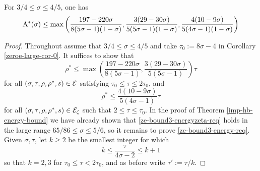 \begin{theorem}\label{imp-energy-bound3}
For $3/4 \le \sigma \le 4/5$, one has 
\[
\mathrm{A}^*(\sigma) \le \max\left(\frac{197 - 220\sigma}{8(5\sigma - 1)(1 - \sigma)}, \frac{3(29 - 30\sigma)}{5(5\sigma - 1)(1 - \sigma)}, \frac{4(10 - 9\sigma)}{5(4\sigma - 1)(1 - \sigma)}\right)
\]
\end{theorem}

\derived 
{}

\begin{proof}
Throughout assume that $3/4 \le \sigma \le 4/5$ and take $\tau_0 := 8\sigma - 4$ in Corollary \ref{zeroe-large-cor-0}. It suffices to show that 
\begin{equation}\label{ze-bound3-energy-req}
\rho^* \le \max\left(\frac{197 - 220\sigma}{8(5\sigma - 1)}, \frac{3(29 - 30\sigma)}{5(5\sigma - 1)}\right)\tau
\end{equation}
for all $(\sigma, \tau, \rho, \rho^*, s) \in \mathcal{E}$ satisfying $\tau_0 \le \tau \le 2\tau_0$, and 
\begin{equation}\label{ze-bound3-energyzeta-req}
\rho^* \le \frac{4(10 - 9\sigma)}{5(4\sigma - 1)}\tau
\end{equation}
for all $(\sigma, \tau, \rho, \rho^*, s) \in \mathcal{E}_\zeta$ such that $2 \le \tau \le \tau_0$.
In the proof of Theorem \ref{imp-hb-energy-bound} we have already shown that \eqref{ze-bound3-energyzeta-req} holds in the large range $65/86 \le \sigma \le 5/6$, so it remains to prove \eqref{ze-bound3-energy-req}. Given $\sigma, \tau$, let $k \ge 2$ be the smallest integer for which 
\begin{equation}
\label{ze-bound3-kdefn}
k \le \frac{\tau}{4\sigma - 2} \le k + 1
\end{equation}
so that $k = 2, 3$ for $\tau_0 \le \tau < 2\tau_0$, and as before write $\tau' := \tau/k$. 


\end{proof}
